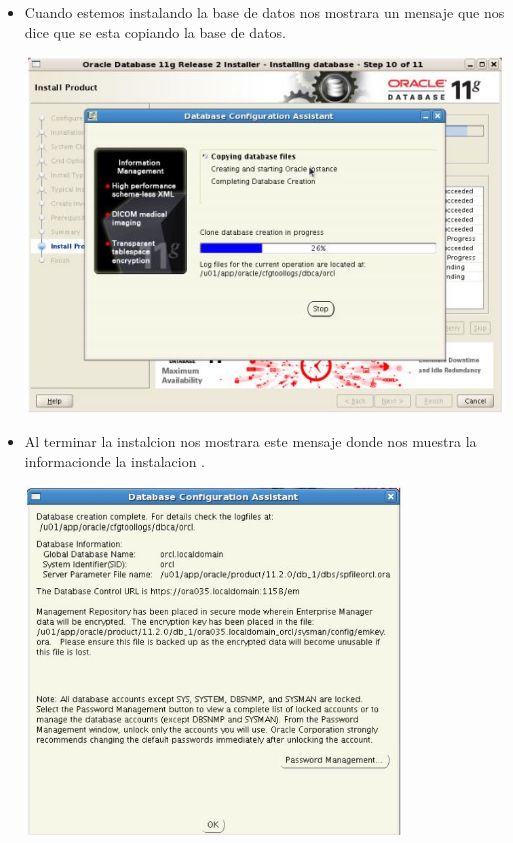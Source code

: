 \begin{itemize}
	\item Cuando estemos instalando la base de datos nos mostrara un mensaje que nos dice que se esta copiando la base de datos.
	\begin{center}
	\includegraphics[width=13cm]{./Imagenes/img57} 
	\end{center}
	
	\item Al terminar la instalcion nos mostrara este mensaje donde nos muestra la informacionde la instalacion .
	\begin{center}
	\includegraphics[width=10cm]{./Imagenes/img58} 
	\end{center}
	
	
\newpage


\end{itemize}
